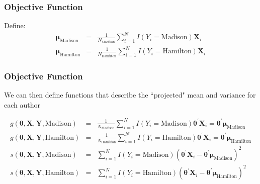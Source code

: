 \documentclass{beamer}
\numberwithin{equation}{section}
\begin{document}
\begin{frame}
\frametitle{Objective Function}



Define:
\begin{eqnarray}
\boldsymbol{\mu}_{\text{Madison}} & = & \frac{1}{N_{\text{Madison}}} \sum_{i=1}^{N} I(Y_{i} = \text{Madison}) \boldsymbol{X}_{i} \nonumber \\
\boldsymbol{\mu}_{\text{Hamilton}} & = & \frac{1}{N_{\text{Hamilton}}} \sum_{i=1}^{N} I(Y_{i} = \text{Hamilton}) \boldsymbol{X}_{i} \nonumber 
\end{eqnarray}









\end{frame}



\begin{frame}
\frametitle{Objective Function}

\begin{small}

We can then define functions that describe the ``projected" mean and variance for each author

\begin{eqnarray}
g(\boldsymbol{\theta}, \boldsymbol{X}, \boldsymbol{Y},  \text{Madison}) & = & \frac{1}{N_{\text{Madison}}} \sum_{i= 1}^{N}  I(Y_{i} = \text{Madison} ) \boldsymbol{\theta}^{'}\boldsymbol{X}_{i}  = \boldsymbol{\theta}^{'} \boldsymbol{\mu}_{\text{Madison}} \nonumber  \\
g(\boldsymbol{\theta}, \boldsymbol{X}, \boldsymbol{Y},  \text{Hamilton}) & = & \frac{1}{N_{\text{Hamilton}}} \sum_{i= 1}^{N}  I(Y_{i} = \text{Hamilton} ) \boldsymbol{\theta}^{'}\boldsymbol{X}_{i}  = \boldsymbol{\theta}^{'} \boldsymbol{\mu}_{\text{Hamilton}} \nonumber  \\
s(\boldsymbol{\theta}, \boldsymbol{X}, \boldsymbol{Y},  \text{Madison}) & = & \sum_{i=1}^{N} I(Y_{i} = \text{Madison} ) (\boldsymbol{\theta}^{'} \boldsymbol{X}_{i} - \boldsymbol{\theta}^{'} \boldsymbol{\mu}_{\text{Madison}})^2 \nonumber \\
s(\boldsymbol{\theta}, \boldsymbol{X}, \boldsymbol{Y},  \text{Hamilton}) & = & \sum_{i=1}^{N} I(Y_{i} = \text{Hamilton} ) (\boldsymbol{\theta}^{'} \boldsymbol{X}_{i} - \boldsymbol{\theta}^{'} \boldsymbol{\mu}_{\text{Hamilton}})^2 \nonumber 
\end{eqnarray}


\end{small}


\end{frame}
\end{document}
